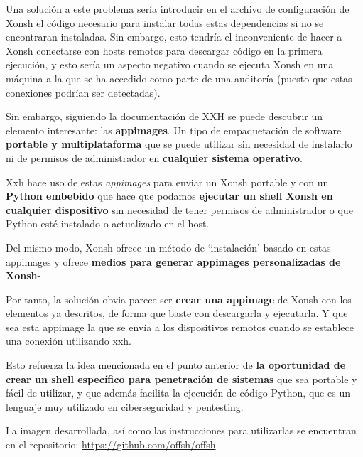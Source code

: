 Una solución a este problema sería introducir en el archivo de configuración de Xonsh el código necesario para instalar todas estas dependencias si no se encontraran instaladas. Sin embargo, esto tendría el inconveniente de hacer a Xonsh conectarse con hosts remotos para descargar código en la primera ejecución, y esto sería un aspecto negativo cuando se ejecuta Xonsh en una máquina a la que se ha accedido como parte de una auditoría (puesto que estas conexiones podrían ser detectadas).

Sin embargo, siguiendo la documentación de XXH se puede descubrir un elemento interesante: las \textbf{appimages}. Un tipo de empaquetación de software \textbf{portable y multiplataforma} que se puede utilizar sin necesidad de instalarlo ni de permisos de administrador en \textbf{cualquier sistema operativo}.

Xxh hace uso de estas \textit{appimages} para enviar un Xonsh portable y con un \textbf{Python embebido} que hace que podamos \textbf{ejecutar un shell Xonsh en cualquier dispositivo} sin necesidad de tener permisos de administrador o que Python esté instalado o actualizado en el host.

Del mismo modo, Xonsh ofrece un método de `instalación' basado en estas appimages y ofrece \textbf{medios para generar appimages personalizadas de Xonsh}-

Por tanto, la solución obvia parece ser \textbf{crear una appimage} de Xonsh con los elementos ya descritos, de forma que baste con descargarla y ejecutarla. Y que sea esta appimage la que se envía a los dispositivos remotos cuando se establece una conexión utilizando xxh.

Esto refuerza la idea mencionada en el punto anterior de \textbf{la oportunidad de crear un shell específico para penetración de sistemas} que sea portable y fácil de utilizar, y que además facilita la ejecución de código Python, que es un lenguaje muy utilizado en ciberseguridad y pentesting.

La imagen desarrollada, así como las instrucciones para utilizarlas se encuentran en el repositorio: \url{https://github.com/offsh/offsh}. 

